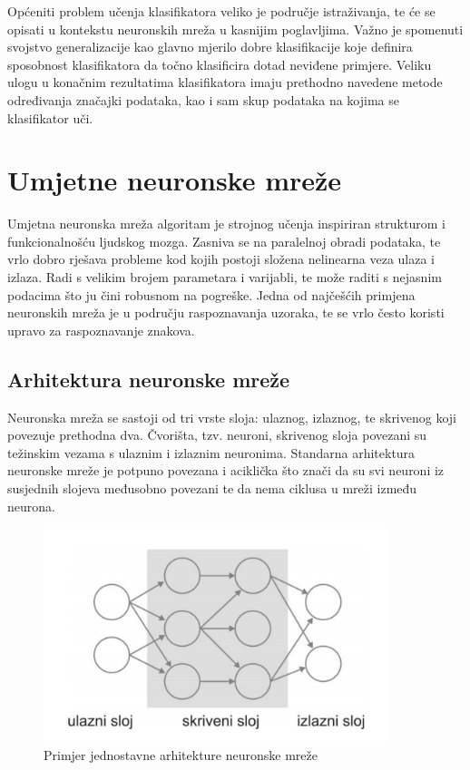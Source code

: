 \documentclass[lmodern, utf8, diplomski, numeric]{fer}
\begin{document}
Općeniti problem učenja klasifikatora veliko je područje istraživanja, te će se opisati u kontekstu neuronskih mreža u kasnijim poglavljima. Važno je spomenuti svojstvo generalizacije kao glavno mjerilo dobre klasifikacije koje definira sposobnost klasifikatora da točno klasificira dotad neviđene primjere. Veliku ulogu u konačnim rezultatima klasifikatora imaju prethodno navedene metode određivanja značajki podataka, kao i sam skup podataka na kojima se klasifikator uči.


  

\chapter{Umjetne neuronske mreže}

Umjetna neuronska mreža  algoritam je strojnog učenja inspiriran strukturom i funkcionalnošću ljudskog mozga. Zasniva se na paralelnoj obradi podataka, te vrlo dobro rješava probleme kod kojih postoji složena nelinearna veza ulaza i izlaza. Radi s velikim brojem parametara i varijabli, te može raditi s nejasnim podacima što ju čini robusnom na pogreške. Jedna od najčešćih primjena neuronskih mreža je u području raspoznavanja uzoraka, te se vrlo često koristi upravo za raspoznavanje znakova.

 

\section{Arhitektura neuronske mreže}

Neuronska mreža se sastoji od tri vrste sloja: ulaznog, izlaznog, te skrivenog koji povezuje prethodna dva. Čvorišta, tzv. neuroni, skrivenog sloja povezani su težinskim vezama s ulaznim i izlaznim neuronima. Standarna arhitektura neuronske mreže je potpuno povezana i aciklička što znači da su svi neuroni iz susjednih slojeva međusobno povezani te da nema ciklusa u mreži između neurona. 

\begin{figure}[ht!]
\centering
\includegraphics[width=10cm]{slike/neural_architecture.png}
\caption{Primjer jednostavne arhitekture neuronske mreže}
\end{figure}
\end{document}
